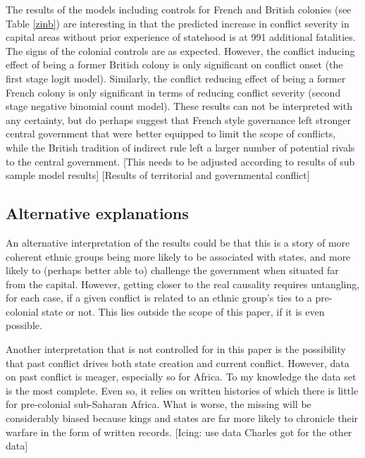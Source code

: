 \documentclass[12pt]{article}
\begin{document}

The results of the models including controls for French and British colonies
(see Table \ref{zinb}) are interesting in that the predicted increase in conflict
severity in capital areas without prior experience of statehood is at 991
additional fatalities. The signs of the colonial controls are as
expected. However, the conflict inducing effect of being a former British
colony is only significant on conflict onset (the first stage logit
model). Similarly, the conflict reducing effect of being a former French colony
is only significant in terms of reducing conflict severity (second stage
negative binomial count model). These results can not be interpreted with any
certainty, but do perhaps suggest that French style governance left stronger
central government that were better equipped to limit the scope of conflicts,
while the British tradition of indirect rule left a larger number of potential
rivals to the central government. [This needs to be adjusted according to
results of sub sample model results] [Results of territorial and governmental
conflict]

\subsection{Alternative explanations} \label{Alternative explanations}

An alternative interpretation of the results could be that this is a
story of more coherent ethnic groups being more likely to be associated with
states, and more likely to (perhaps better able to) challenge the government
when situated far from the capital. However, getting closer to the real
causality requires untangling, for each case, if a given conflict is related to
an ethnic group's ties to a pre-colonial state or not. This lies outside the
scope of this paper, if it is even possible.

Another interpretation that is not controlled for in this paper is the
possibility that past conflict drives both state creation and current conflict.
However, data on past conflict is meager, especially so for Africa. To my
knowledge the \citet{Brecke1999} data set is the most complete. Even so, it
relies on written histories of which there is little for pre-colonial
sub-Saharan Africa. What is worse, the missing will be considerably biased
because kings and states are far more likely to chronicle their warfare in the
form of written records. [Icing: use data Charles got for the other data]
\end{document}
